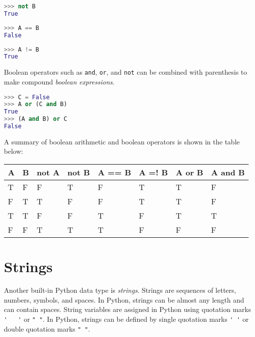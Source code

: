 \documentclass{book}
\newcommand{\passthrough}[1]{#1}
\begin{document}
\begin{lstlisting}[language=Python]
>>> not B
True
\end{lstlisting}

\begin{lstlisting}[language=Python]
>>> A == B
False
\end{lstlisting}

\begin{lstlisting}[language=Python]
>>> A != B
True
\end{lstlisting}

Boolean operators such as \passthrough{\lstinline!and!},
\passthrough{\lstinline!or!}, and \passthrough{\lstinline!not!} can be
combined with parenthesis to make compound \emph{boolean expressions}.

\begin{lstlisting}[language=Python]
>>> C = False
>>> A or (C and B)
True
>>> (A and B) or C
False
\end{lstlisting}
    




    
        A summary of boolean arithmetic and boolean operators is shown in the
table below:

\begin{longtable}[]{@{}llllllll@{}}
\toprule
A & B & not A & not B & A == B & A =! B & A or B & A and
B\tabularnewline
\midrule
\endhead
T & F & F & T & F & T & T & F\tabularnewline
F & T & T & F & F & T & T & F\tabularnewline
T & T & F & F & T & F & T & T\tabularnewline
F & F & T & T & T & F & F & F\tabularnewline
\bottomrule
\end{longtable}
    




    
        \hypertarget{strings}{%
\section{Strings}\label{strings}}
    




    
        Another built-in Python data type is \emph{strings}. Strings are
sequences of letters, numbers, symbols, and spaces. In Python, strings
can be almost any length and can contain spaces. String variables are
assigned in Python using quotation marks \passthrough{\lstinline!'   '!}
or \passthrough{\lstinline!" "!}. In Python, strings can be defined by
single quotation marks \passthrough{\lstinline!' '!} or double quotation
marks \passthrough{\lstinline!" "!}.
\end{document}
